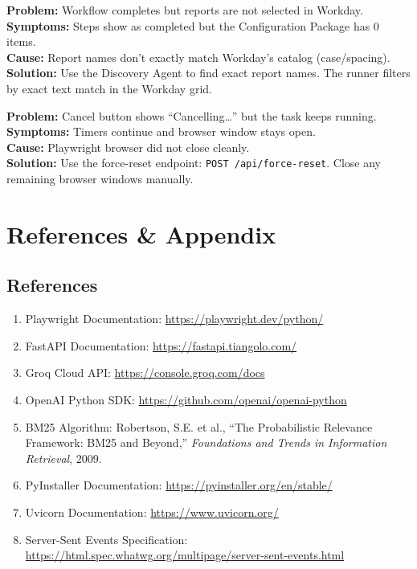 \documentclass[12pt,a4paper]{article}
\begin{document}
\textbf{Problem:} Workflow completes but reports are not selected in Workday.\\
\textbf{Symptoms:} Steps show as completed but the Configuration Package has 0 items.\\
\textbf{Cause:} Report names don't exactly match Workday's catalog (case/spacing).\\
\textbf{Solution:} Use the Discovery Agent to find exact report names. The runner filters by exact text match in the Workday grid.

\textbf{Problem:} Cancel button shows ``Cancelling\ldots'' but the task keeps running.\\
\textbf{Symptoms:} Timers continue and browser window stays open.\\
\textbf{Cause:} Playwright browser did not close cleanly.\\
\textbf{Solution:} Use the force-reset endpoint: \texttt{POST /api/force-reset}. Close any remaining browser windows manually.

\section{References \& Appendix}
\label{sec:references}

\subsection{References}
\label{subsec:references}

\begin{enumerate}[leftmargin=2em]
  \item Playwright Documentation: \url{https://playwright.dev/python/}
  \item FastAPI Documentation: \url{https://fastapi.tiangolo.com/}
  \item Groq Cloud API: \url{https://console.groq.com/docs}
  \item OpenAI Python SDK: \url{https://github.com/openai/openai-python}
  \item BM25 Algorithm: Robertson, S.E. et al., ``The Probabilistic Relevance Framework: BM25 and Beyond,'' \textit{Foundations and Trends in Information Retrieval}, 2009.
  \item PyInstaller Documentation: \url{https://pyinstaller.org/en/stable/}
  \item Uvicorn Documentation: \url{https://www.uvicorn.org/}
  \item Server-Sent Events Specification: \url{https://html.spec.whatwg.org/multipage/server-sent-events.html}
\end{enumerate}
\end{document}
